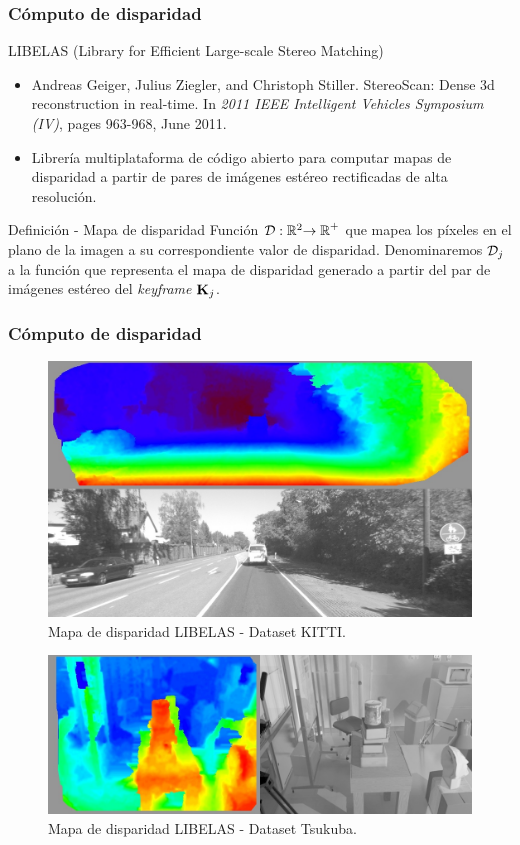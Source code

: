 \documentclass[compress]{beamer}
\begin{document}
\begin{frame}
\frametitle{Cómputo de disparidad}

\begin{block}{LIBELAS (Library for Efficient Large-scale Stereo Matching)}
\begin{itemize}
\item Andreas Geiger, Julius Ziegler, and Christoph Stiller. StereoScan: Dense 3d reconstruction in real-time. In \textit{2011 IEEE Intelligent Vehicles Symposium (IV)}, pages 963-968, June 2011.
\item Librería multiplataforma de código abierto para computar mapas de disparidad a partir de pares de imágenes estéreo rectificadas de alta resolución.
\end{itemize}
\end{block}

\begin{block}{Definición - Mapa de disparidad}
Función $\mathcal D:\mathbb{R}^{2}\mathbb{\rightarrow R}^{+}$ que mapea los píxeles en el plano de la imagen a su correspondiente valor de disparidad. Denominaremos $\mathcal D_{j}$ a la función que representa el mapa de disparidad generado a partir del par de imágenes estéreo del \emph{keyframe} $\boldsymbol{\mathbf{K}}_{j}$.
\end{block}

\end{frame}


\begin{frame}
\frametitle{Cómputo de disparidad}

\begin{figure}[htb]
	\centering
	\includegraphics[width=0.5\columnwidth]{method/libelas_merge_kitti04_22.jpg}
	\caption{Mapa de disparidad LIBELAS - Dataset KITTI.}
\end{figure}
\begin{figure}[htb]
	\centering
	\includegraphics[width=0.5\columnwidth]{method/libelas_merge_tsukuba_222.jpg}
	\caption{Mapa de disparidad LIBELAS - Dataset Tsukuba.}
\end{figure}

\end{frame}
\end{document}

